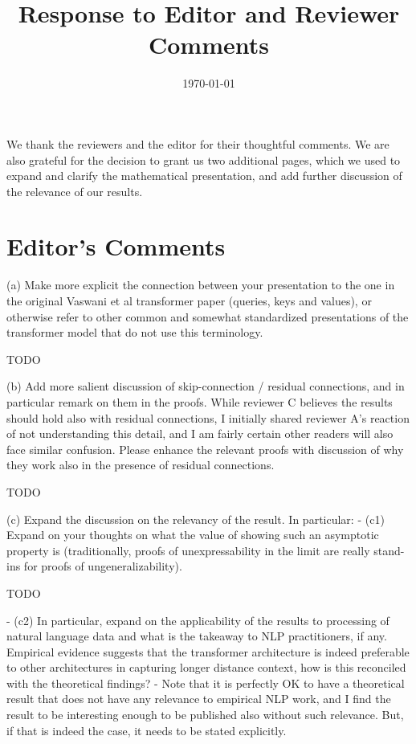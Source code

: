 \documentclass[11pt,a4paper]{article}
\title{Response to Editor and Reviewer Comments}
\date{\today}
\newcommand\response[1]{{\color{blue}#1}}
\begin{document}
\maketitle 

\response{We thank the reviewers and the editor for their thoughtful comments.
We are also grateful for the decision to grant us two additional pages, which we used to expand and clarify the mathematical presentation, and add further discussion of the relevance of our results.}

\section{Editor's Comments}

(a) Make more explicit the connection between your presentation to the one
in the original Vaswani et al transformer paper (queries, keys and values),
or otherwise refer to other common and somewhat standardized presentations
of the transformer model that do not use this terminology.

\response{TODO}

(b) Add more salient discussion of skip-connection / residual connections,
and in particular remark on them in the proofs. While reviewer C believes
the results should hold also with residual connections, I initially shared
reviewer A's reaction of not understanding this detail, and I am fairly
certain other readers will also face similar confusion. Please enhance the
relevant proofs with discussion of why they work also in the presence of
residual connections.

\response{TODO}

(c) Expand the discussion on the relevancy of the result. In particular:
- (c1) Expand on your thoughts on what the value of showing such an
asymptotic property is (traditionally, proofs of unexpressability in the
limit are really stand-ins for proofs of ungeneralizability).

\response{TODO}

- (c2) In particular, expand on the applicability of the results to
processing of natural language data and what is the takeaway to NLP
practitioners, if any. Empirical evidence suggests that the transformer
architecture is indeed preferable to other architectures in capturing longer
distance context, how is this reconciled with the theoretical findings?
- Note that it is perfectly OK to have a theoretical result that does not
have any relevance to empirical NLP work, and I find the result to be
interesting enough to be published also without such relevance. But, if that
is indeed the case, it needs to be stated explicitly.
\end{document}
